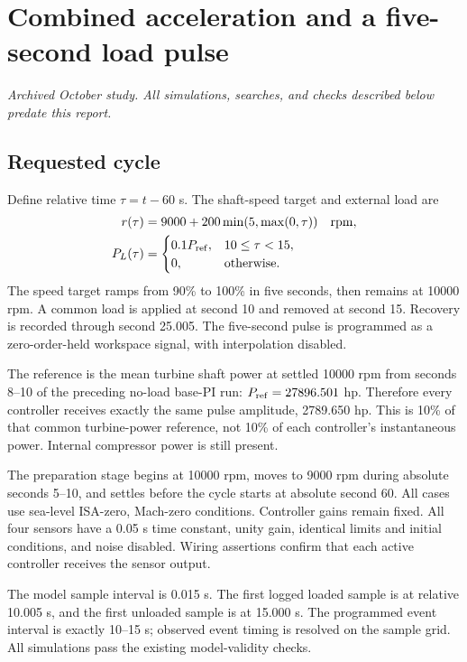 \chapter{Combined acceleration and a five-second load pulse}
\textit{Archived October study. All simulations, searches, and checks described below predate this report.}\par

\section{Requested cycle}
Define relative time $\tau=t-60$ s. The shaft-speed target and external load are
\begin{align}
r(\tau)&=9000+200\min(5,\max(0,\tau))\quad\mathrm{rpm},\\
P_L(\tau)&=\begin{cases}0.1P_{\rm ref},&10\le\tau<15,\\0,&\text{otherwise}.\end{cases}
\end{align}
The speed target ramps from 90\% to 100\% in five seconds, then remains at 10000 rpm. A common load is applied at second 10 and removed at second 15. Recovery is recorded through second 25.005. The five-second pulse is programmed as a zero-order-held workspace signal, with interpolation disabled.

The reference is the mean turbine shaft power at settled 10000 rpm from seconds 8--10 of the preceding no-load base-PI run: $P_{\rm ref}=27896.501$ hp. Therefore every controller receives exactly the same pulse amplitude, 2789.650 hp. This is 10\% of that common turbine-power reference, not 10\% of each controller's instantaneous power. Internal compressor power is still present.

The preparation stage begins at 10000 rpm, moves to 9000 rpm during absolute seconds 5--10, and settles before the cycle starts at absolute second 60. All cases use sea-level ISA-zero, Mach-zero conditions. Controller gains remain fixed. All four sensors have a 0.05 s time constant, unity gain, identical limits and initial conditions, and noise disabled. Wiring assertions confirm that each active controller receives the sensor output.

The model sample interval is 0.015 s. The first logged loaded sample is at relative 10.005 s, and the first unloaded sample is at 15.000 s. The programmed event interval is exactly 10--15 s; observed event timing is resolved on the sample grid. All simulations pass the existing model-validity checks.
